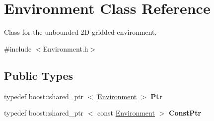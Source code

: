 \hypertarget{class_environment}{\section{\-Environment \-Class \-Reference}
\label{class_environment}
}


\-Class for the unbounded 2\-D gridded environment.  




{\ttfamily \#include $<$\-Environment.\-h$>$}

\subsection*{\-Public \-Types}
\begin{DoxyCompactItemize}
\item 
\hypertarget{class_environment_a53eb6336aaf9502342b7b64fc4ba3036}{typedef boost\-::shared\-\_\-ptr\*
$<$ \hyperlink{class_environment}{\-Environment} $>$ {\bfseries \-Ptr}}\label{class_environment_a53eb6336aaf9502342b7b64fc4ba3036}

\item 
\hypertarget{class_environment_acdfb7fa4f2b58fa21e752cfa22f2bb8f}{typedef boost\-::shared\-\_\-ptr\*
$<$ const \hyperlink{class_environment}{\-Environment} $>$ {\bfseries \-Const\-Ptr}}\label{class_environment_acdfb7fa4f2b58fa21e752cfa22f2bb8f}

\end{DoxyCompactItemize}
